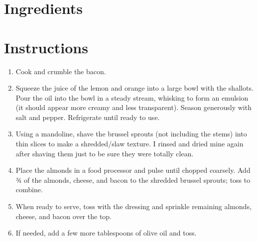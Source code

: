 \documentclass[letterpaper,10pt,english]{sphinxmanual}
\begin{document}
\section{Ingredients}
\label{\detokenize{baconbrussel:ingredients}}
%
\begin{sphinxVerbatim}[commandchars=\\\{\}]
 

 

   

   

  

      

   

  

    
\end{sphinxVerbatim}


\section{Instructions}
\label{\detokenize{baconbrussel:instructions}}\begin{enumerate}
\item {} 
Cook and crumble the bacon.

\item {} 
Squeeze the juice of the lemon and orange into a large bowl with the shallots. Pour the oil into the bowl in a steady stream, whisking to form an emulsion (it should appear more creamy and less transparent). Season generously with salt and pepper. Refrigerate until ready to use.

\item {} 
Using a mandoline, shave the brussel sprouts (not including the stems) into thin slices to make a shredded/slaw texture. I rinsed and dried mine again after shaving them just to be sure they were totally clean.

\item {} 
Place the almonds in a food processor and pulse until chopped coarsely. Add ¾ of the almonds, cheese, and bacon to the shredded brussel sprouts; toss to combine.

\item {} 
When ready to serve, toss with the dressing and sprinkle remaining almonds, cheese, and bacon over the top.

\item {} 
If needed, add a few more tablespoons of olive oil and toss.

\end{enumerate}
\end{document}
